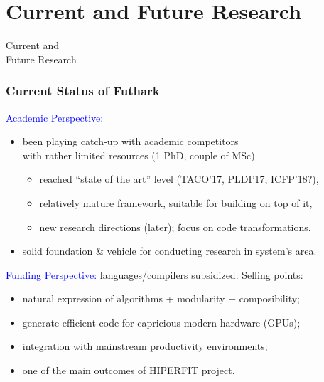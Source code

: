 \documentclass{beamer}
\newcommand{\blue}[1]{\textcolor{Blue}{{#1}}}
\begin{document}
\section{Current and Future Research}

\begin{frame}
  \begin{center}
    \Huge
    Current and\\
    Future Research
  \end{center}
\end{frame}

\begin{frame}[fragile,t]
   \frametitle{Current Status of Futhark}

\blue{Academic Perspective:}\smallskip
\begin{itemize}
    \item been playing catch-up with academic competitors\\ 
            with rather limited resources (1 PhD, couple of MSc)\smallskip
        \begin{itemize}
            \item reached ``state of the art'' level (TACO'17, PLDI'17, ICFP'18?),
            \item relatively mature framework, suitable for building on top of it,
            \item new research directions (later); focus on code transformations.
        \end{itemize}\smallskip
    \item solid foundation \& vehicle for conducting research in system's area.
\end{itemize}
\bigskip

\blue{Funding Perspective:} languages/compilers subsidized. Selling points:\smallskip
\begin{itemize}
    \item natural expression of algorithms + modularity + composibility; \smallskip
    \item generate efficient code for capricious modern hardware (GPUs); \smallskip
    \item integration with mainstream productivity environments;\smallskip
    \item one of the main outcomes of HIPERFIT project.
\end{itemize}

\end{frame}
\end{document}
